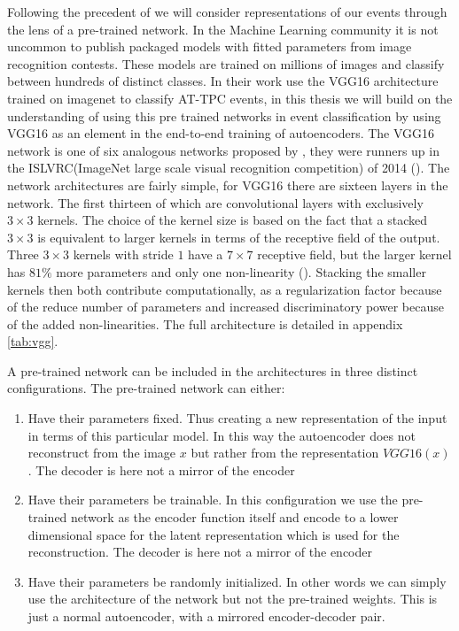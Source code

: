 Following the precedent of  \cite{Kuchera2019} we will consider representations of our events through the lens of a pre-trained network. In the Machine Learning community it is not uncommon to publish packaged models with fitted parameters from image recognition contests. These models are trained on millions of images and classify between hundreds of distinct classes. In their work \cite{Kuchera2019} use the VGG16 architecture trained on imagenet to classify AT-TPC events, in this thesis we will build on the understanding of using this pre trained networks in event classification by using VGG16 as an element in the end-to-end training of autoencoders. The VGG16 network is  one of six analogous networks proposed by \citet{Simonyan2014}, they were runners up in the ISLVRC(ImageNet large scale visual recognition competition) of 2014 (\cite{Russakovsky2015}). The network architectures are fairly simple, for VGG16 there are sixteen layers in the network. The first thirteen of which are convolutional layers with exclusively $3 \times 3$ kernels. The choice of the kernel size  is based on the fact that a stacked $3 \times 3$ is equivalent to larger kernels in terms of the receptive field of the output. Three $3 \times 3$ kernels with stride $1$ have a $7 \times 7$ receptive field, but the larger kernel has $81\%$ more parameters and only one non-linearity (\cite{Simonyan2014}). Stacking the smaller kernels then both contribute computationally, as a regularization factor because of the reduce number of parameters and increased discriminatory power because of the added non-linearities. The full architecture is detailed in appendix \ref{tab:vgg}.

A pre-trained network can be included in the architectures in three distinct configurations. The pre-trained network can either:

\begin{enumerate}
\item Have their parameters fixed. Thus creating a new representation of the input in terms of this particular model. In this way the autoencoder does not reconstruct from the image $x$ but rather from the representation $VGG16(x)$. The decoder is here not a mirror of the encoder
\item Have their parameters be trainable. In this configuration we use the pre-trained network as the encoder function itself and encode to a lower dimensional space for the latent representation which is used for the reconstruction. The decoder is here not a mirror  of the encoder
\item Have their parameters be randomly initialized. In other words we can simply use the architecture of  the network but not the pre-trained weights. This is just a normal autoencoder, with a mirrored encoder-decoder pair. 
\end{enumerate}

